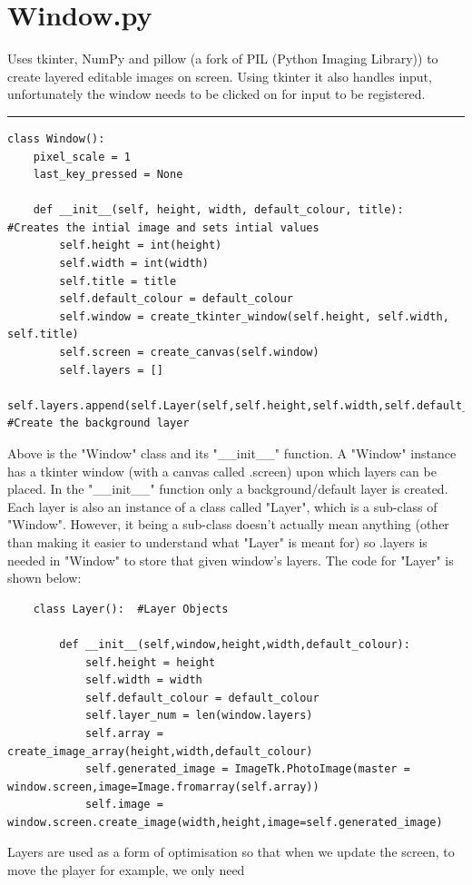 \documentclass{article}
\begin{document}

\clearpage
\section{Window.py}
Uses tkinter, NumPy and pillow (a fork of PIL (Python Imaging Library)) to create layered editable images on screen. Using tkinter it also handles input, unfortunately the window needs to be clicked on for input to be registered.

\textcolor[RGB]{220,220,220}{\rule{\linewidth}{0.2pt}}
\begin{lstlisting}
class Window():
    pixel_scale = 1
    last_key_pressed = None
    
    def __init__(self, height, width, default_colour, title):   #Creates the intial image and sets intial values
        self.height = int(height)
        self.width = int(width)
        self.title = title
        self.default_colour = default_colour
        self.window = create_tkinter_window(self.height, self.width, self.title)
        self.screen = create_canvas(self.window)
        self.layers = []
        self.layers.append(self.Layer(self,self.height,self.width,self.default_colour)) #Create the background layer
\end{lstlisting}
Above is the "Window" class and its "\_\_init\_\_" function. A "Window" instance has a tkinter window (with a canvas called .screen) upon which
layers can be placed. In the "\_\_init\_\_" function only a background/default layer is created. Each layer is also an instance of
a class called "Layer", which is a sub-class of "Window". However, it being a sub-class doesn't actually mean anything (other than making it easier to
understand what "Layer" is meant for) so .layers is needed in "Window" to store that given window's layers. The code for "Layer" is shown below:
\begin{lstlisting}
    class Layer():  #Layer Objects

        def __init__(self,window,height,width,default_colour):
            self.height = height
            self.width = width
            self.default_colour = default_colour
            self.layer_num = len(window.layers)
            self.array = create_image_array(height,width,default_colour)
            self.generated_image = ImageTk.PhotoImage(master = window.screen,image=Image.fromarray(self.array))
            self.image = window.screen.create_image(width,height,image=self.generated_image)
\end{lstlisting}
Layers are used as a form of optimisation so that when we update the screen, to move the player for example, we only need
\end{document}
